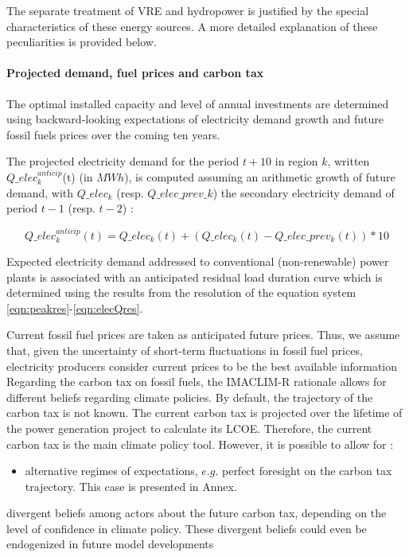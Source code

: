 The separate treatment of VRE and hydropower is justified by the special characteristics of these energy sources. A more detailed explanation of these peculiarities is provided below.

\paragraph{Projected demand, fuel prices and carbon tax}

The optimal installed capacity and level of annual investments are determined using backward-looking expectations of electricity demand growth and  future fossil fuels prices over the coming ten years.

The projected electricity demand for the period $t+10$ in region $k$, written $Q\_elec_k^{anticip}$(t) (in $MWh$), is computed assuming an arithmetic growth of future demand, with $Q\_elec_k$ (resp. $Q\_elec\_prev\_k$) the secondary electricity demand of period $t-1$ (resp. $t-2$)  : 

\begin{dmath}
    Q\_elec_k^{anticip}(t) = Q\_elec_k(t) + (Q\_elec_k(t) - Q\_elec\_prev_k(t))*10
    \label{eqn:elecQAnticip}
\end{dmath}

Expected electricity demand addressed to conventional (non-renewable) power plants is associated with an anticipated residual load duration curve which is determined using the results from the resolution of the equation system \ref{eqn:peakres}-\ref{eqn:elecQres}.

Current fossil fuel prices are taken as anticipated future prices. Thus, we assume that, given the uncertainty of short-term fluctuations in fossil fuel prices, electricity producers consider current prices to be the best available information 
Regarding the carbon tax on fossil fuels, the IMACLIM-R rationale allows for different beliefs regarding climate policies. By default, the trajectory of the carbon tax is not known. The current carbon tax is projected over the lifetime of the power generation project to calculate its LCOE. Therefore, the current carbon tax is the main climate policy tool. However, it is possible to allow for :
\begin{itemize}
    \item alternative regimes of expectations, $e.g.$ perfect foresight on the carbon tax trajectory. This case is presented in Annex.
\end{itemize} divergent beliefs among actors about the future carbon tax, depending on the level of confidence in climate policy. These divergent beliefs could even be endogenized in future model developments

